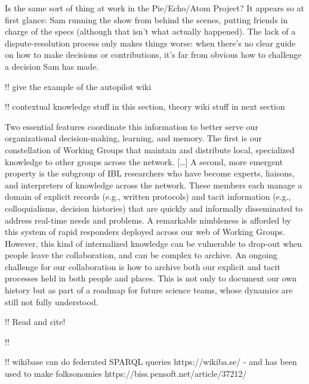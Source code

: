 \documentclass[10pt]{article}
\begin{document}
\begin{multicols}{2}
\begin{leftbar}
Is the same sort of thing at work in the Pie/Echo/Atom Project? It
appears so at first glance: Sam running the show from behind the scenes,
putting friends in charge of the specs (although that isn't what
actually happened). The lack of a dispute-resolution process only makes
things worse: when there's no clear guide on how to make decisions or
contributions, it's far from obvious how to challenge a decision Sam has
made. \cite{swartzSecretsStandards2003} 
\end{leftbar}

!! give the example of the autopilot wiki

!! contextual knowledge stuff in this section, theory wiki stuff in next
section

\begin{leftbar}
Two essential features coordinate this information to better serve our
organizational decision-making, learning, and memory. The first is our
constellation of Working Groups that maintain and distribute local,
specialized knowledge to other groups across the network. {[}\ldots{]} A
second, more emergent property is the subgroup of IBL researchers who
have become experts, liaisons, and interpreters of knowledge across the
network. These members each manage a domain of explicit records (e.g.,
written protocols) and tacit information (e.g., colloquialisms, decision
histories) that are quickly and informally disseminated to address
real-time needs and problems. A remarkable nimbleness is afforded by
this system of rapid responders deployed across our web of Working
Groups. However, this kind of internalized knowledge can be vulnerable
to drop-out when people leave the collaboration, and can be complex to
archive. An ongoing challenge for our collaboration is how to archive
both our explicit and tacit processes held in both people and places.
This is not only to document our own history but as part of a roadmap
for future science teams, whose dynamics are still not fully understood.
\cite{woolKnowledgeNetworksHow2020} 
\end{leftbar}

\cite{kamelboulosSemanticWikisComprehensible2009} 

!! Read and cite! \cite{classeDistributedInfrastructureSupport2017} 

!! \cite{goodSocialTaggingLife2009} 

!! wikibase can do federated SPARQL queries https://wikiba.se/ - and has
been used to make folksonomies https://biss.pensoft.net/article/37212/


\end{multicols}
\end{document}
